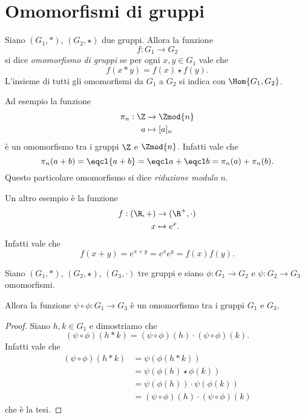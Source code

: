 \section{Omomorfismi di gruppi}

\begin{definition} \label{def:omo_gruppi}
    Siano $(G_1, *)$, $(G_2, \star)$ due gruppi. Allora la funzione \[
        f : G_1 \to G_2    
    \] si dice \emph{omomorfismo di gruppi} se per ogni $x, y \in G_1$ vale che \begin{equation}
        f(x * y) = f(x) \star f(y).
    \end{equation}
    L'insieme di tutti gli omomorfismi da $G_1$ a $G_2$ si indica con $\Hom{G_1, G_2}$.
\end{definition}

\begin{example}
    Ad esempio la funzione \begin{align*}
    \pi_n : \Z &\to \Zmod{n}\\
    a &\mapsto [a]_n
\end{align*} è un omomorfismo tra i gruppi $\Z$ e $\Zmod{n}$. Infatti vale che \[
    \pi_n(a + b) = \eqcl{a + b} = \eqcl a + \eqcl b = \pi_n(a) + \pi_n(b).
\] Questo particolare omomorfismo si dice \emph{riduzione modulo $n$}.
\end{example}

\begin{example}
    Un altro esempio è la funzione \begin{align*}
    f : (\R, +) &\to (\R^+, {\cdot})\\
    x &\mapsto e^x.
\end{align*} Infatti vale che \[
    f(x + y) = e^{x + y} = e^xe^y = f(x)f(y).    
\]
\end{example}

\begin{proposition}
     \label{prop:comp_omo}
    Siano $(G_1, *)$, $(G_2, \star)$, $(G_3, \cdot)$ tre gruppi e siano $\phi : G_1 \to G_2$ e $\psi : G_2 \to G_3$ omomorfismi.

    Allora la funzione $\psi \circ \phi : G_1 \to G_3$ è un omomorfismo tra i gruppi $G_1$ e $G_3$.
\end{proposition}
\begin{proof}
    Siano $h, k \in G_1$ e dimostriamo che \[
        (\psi \circ \phi)(h * k) = (\psi \circ \phi)(h) \cdot (\psi \circ \phi)(k).
    \] Infatti vale che
    \begin{align*}
        (\psi \circ \phi)(h * k) &= \psi(\phi(h * k)) \tag{$\phi$ omo.}\\
        &= \psi(\phi(h) \star \phi(k)) \tag{$\psi$ omo.}\\
        &= \psi(\phi(h)) \cdot \psi(\phi(k)) \\
        &= (\psi \circ \phi)(h) \cdot (\psi \circ \phi)(k)
    \end{align*}
    che è la tesi.
\end{proof}


